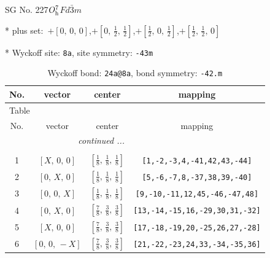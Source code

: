 \documentclass[fleqn,8pt]{jsarticle}
\begin{document}
\setcounter{MaxMatrixCols}{32}

\renewcommand{\tablename}{Table~}
\renewcommand{\figurename}{Figure~}
\begin{center}
\LARGE
SG No. 227\quad$O_{\rm h}^{7}$\quad$Fd\bar{3}m$\quad[ cubic ]
\end{center}

* plus set:\,\,\,$+\left[ 0,\, 0,\, 0 \right]$,\quad $+\left[ 0,\, \frac{1}{2},\, \frac{1}{2} \right]$,\quad $+\left[ \frac{1}{2},\, 0,\, \frac{1}{2} \right]$,\quad $+\left[ \frac{1}{2},\, \frac{1}{2},\, 0 \right]$


* Wyckoff site: {\tt 8a}, site symmetry: {\tt -43m}
\renewcommand{\arraystretch}{1.2}
\begin{longtable}{cccc}
\caption{Wyckoff bond: {\tt 24a@8a}, bond symmetry: {\tt -42.m}}
 \\
 \hline \hline
No. & vector & center & mapping \\ \hline \endfirsthead

\multicolumn{3}{l}{\tablename\ \thetable{}} \\
 \hline \hline
No. & vector & center & mapping \\ \hline \endhead

 \hline \hline
\multicolumn{3}{r}{\footnotesize\it continued ...} \\ \endfoot

 \hline \hline
\multicolumn{3}{r}{} \\ \endlastfoot

1 & $\left[ X,\, 0,\, 0 \right]$ & $\left[ \frac{1}{8},\, \frac{1}{8},\, \frac{1}{8} \right]$ & {\tt [1,-2,-3,4,-41,42,43,-44]} \\ \hline
2 & $\left[ 0,\, X,\, 0 \right]$ & $\left[ \frac{1}{8},\, \frac{1}{8},\, \frac{1}{8} \right]$ & {\tt [5,-6,-7,8,-37,38,39,-40]} \\ \hline
3 & $\left[ 0,\, 0,\, X \right]$ & $\left[ \frac{1}{8},\, \frac{1}{8},\, \frac{1}{8} \right]$ & {\tt [9,-10,-11,12,45,-46,-47,48]} \\ \hline
4 & $\left[ 0,\, X,\, 0 \right]$ & $\left[ \frac{7}{8},\, \frac{3}{8},\, \frac{3}{8} \right]$ & {\tt [13,-14,-15,16,-29,30,31,-32]} \\ \hline
5 & $\left[ X,\, 0,\, 0 \right]$ & $\left[ \frac{7}{8},\, \frac{3}{8},\, \frac{3}{8} \right]$ & {\tt [17,-18,-19,20,-25,26,27,-28]} \\ \hline
6 & $\left[ 0,\, 0,\, - X \right]$ & $\left[ \frac{7}{8},\, \frac{3}{8},\, \frac{3}{8} \right]$ & {\tt [21,-22,-23,24,33,-34,-35,36]} \\
\end{longtable}
\end{document}
